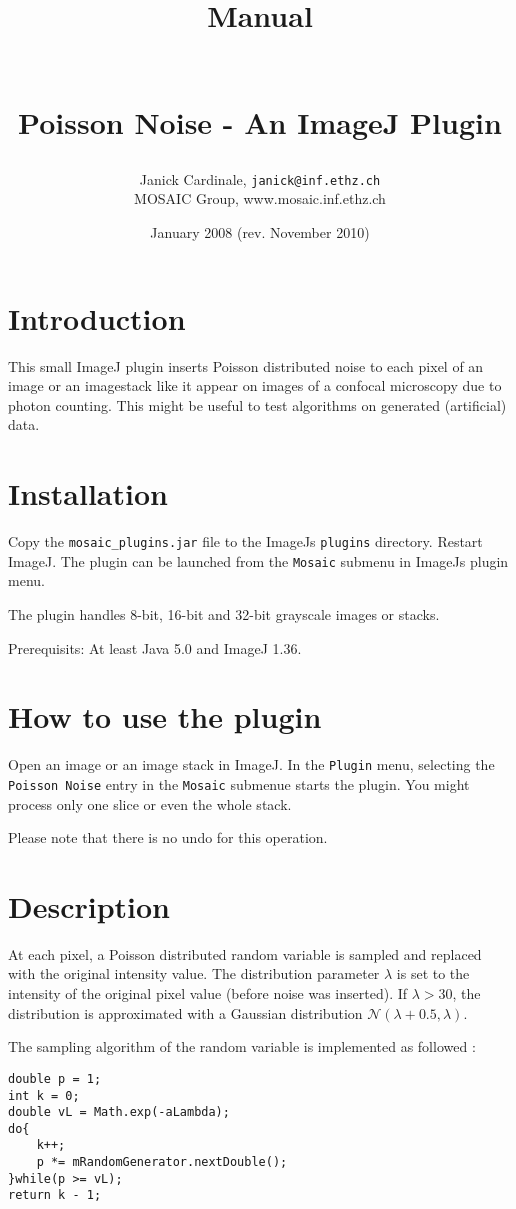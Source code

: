 \documentclass{scrartcl}
\title{\begin{small}Manual\end{small}\\Poisson Noise - An ImageJ Plugin}
\date{January 2008 (rev. November 2010)}
\author{Janick Cardinale, \texttt{janick@inf.ethz.ch}\\MOSAIC Group, www.mosaic.inf.ethz.ch}
\begin{document}
\maketitle

\section{Introduction}
\label{sec:intro}
This small ImageJ plugin inserts Poisson distributed noise to each pixel of an image or an imagestack like it appear on images of a confocal microscopy due to photon counting. This might be useful to test algorithms on generated (artificial) data. 

\section{Installation}
Copy the \texttt{mosaic\_plugins.jar} file to the ImageJs \texttt{plugins} directory. Restart ImageJ. The plugin can be launched from the \texttt{Mosaic} submenu in ImageJs plugin menu. 

The plugin handles 8-bit, 16-bit and 32-bit grayscale images or stacks. 

Prerequisits: At least Java 5.0 and ImageJ 1.36.

\section{How to use the plugin}
Open an image or an image stack in ImageJ. In the \texttt{Plugin} menu, selecting the \texttt{Poisson Noise} entry in the \texttt{Mosaic} submenue starts the plugin. You might process only one slice or even the whole stack.

Please note that there is no undo for this operation.

\section{Description}
At each pixel, a Poisson distributed random variable is sampled and replaced with the original intensity value. The distribution parameter $\lambda$ is set to the intensity of the original pixel value (before noise was inserted). If $\lambda > 30$, the distribution is approximated with a Gaussian distribution $\mathcal{N}(\lambda + 0.5,\lambda)$. 

The sampling algorithm of the random variable is implemented as followed \cite{Knuth}:
\begin{lstlisting}
double p = 1;
int k = 0;
double vL = Math.exp(-aLambda);
do{
	k++;
	p *= mRandomGenerator.nextDouble();
}while(p >= vL);
return k - 1;
\end{lstlisting}
\end{document}
